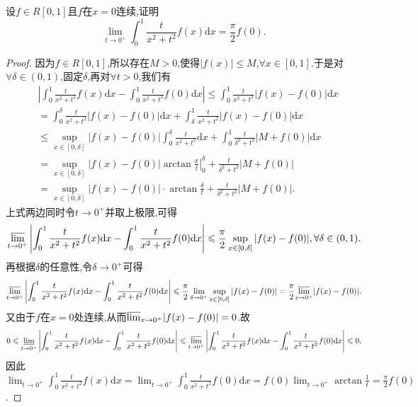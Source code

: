 \documentclass[../../main.tex]{subfiles}
\begin{document}
\begin{example}[$\,\,$Possion核]\label{example:Possion核}
设\(f\in R[0,1]\)且\(f\)在\(x = 0\)连续,证明
\[
\lim_{t\rightarrow 0^+} \int_0^1{\frac{t}{x^2+t^2}f(x)\mathrm{d}x}=\frac{\pi}{2}f(0).
\]
\end{example}
\begin{proof}
因为\(f\in R[0,1]\),所以存在\(M > 0\),使得\(\vert f(x)\vert\leqslant M\),\(\forall x\in [0,1]\).于是对\(\forall\delta\in(0,1)\),固定\(\delta\),再对\(\forall t > 0\),我们有
\begin{align*}
&\left|\int_0^1\frac{t}{x^2 + t^2}f(x)\mathrm{d}x - \int_0^1\frac{t}{x^2 + t^2}f(0)\mathrm{d}x\right| \leqslant \int_0^1\frac{t}{x^2 + t^2}\vert f(x) - f(0)\vert \mathrm{d}x\\
&= \int_0^{\delta}\frac{t}{x^2 + t^2}\vert f(x) - f(0)\vert \mathrm{d}x + \int_{\delta}^1\frac{t}{x^2 + t^2}\vert f(x) - f(0)\vert \mathrm{d}x\\
&\leqslant \sup_{x\in[0,\delta]}\vert f(x) - f(0)\vert\int_0^{\delta}\frac{t}{x^2 + t^2}\mathrm{d}x + \int_0^1\frac{t}{\delta^2 + t^2}\vert M + f(0)\vert \mathrm{d}x\\
&= \sup_{x\in[0,\delta]}\vert f(x) - f(0)\vert\left.\arctan\frac{x}{t}\right|_{0}^{\delta} + \frac{t}{\delta^2 + t^2}\vert M + f(0)\vert\\
&= \sup_{x\in[0,\delta]}\vert f(x) - f(0)\vert\cdot\arctan\frac{\delta}{t} + \frac{t}{\delta^2 + t^2}\vert M + f(0)\vert.
\end{align*}
上式两边同时令\(t\rightarrow 0^+\)并取上极限,可得
\[
{\varlimsup_{t\rightarrow 0^+}}\left|\int_0^1\frac{t}{x^2 + t^2}f(x)\mathrm{d}x - \int_0^1\frac{t}{x^2 + t^2}f(0)\mathrm{d}x\right| \leqslant \frac{\pi}{2}\sup_{x\in[0,\delta]}\vert f(x) - f(0)\vert, \forall\delta\in(0,1).
\]
再根据\(\delta\)的任意性,令\(\delta\rightarrow 0^+\)可得
\[
{\varlimsup_{t\rightarrow 0^+}}\left|\int_0^1\frac{t}{x^2 + t^2}f(x)\mathrm{d}x - \int_0^1\frac{t}{x^2 + t^2}f(0)\mathrm{d}x\right| \leqslant \frac{\pi}{2}\lim_{\delta\rightarrow 0^+}\sup_{x\in[0,\delta]}\vert f(x) - f(0)\vert = \frac{\pi}{2}{\varlimsup_{x\rightarrow 0^+}}\vert f(x) - f(0)\vert.
\]
又由于\(f\)在\(x = 0\)处连续,从而\({\varlimsup_{x\rightarrow 0^+}}\vert f(x) - f(0)\vert = 0\).故
\[
0\leqslant \underset{t\rightarrow 0^+}{{\varliminf }}\left| \int_0^1{\frac{t}{x^2+t^2}f(x)\mathrm{d}x}-\int_0^1{\frac{t}{x^2+t^2}f(0)\mathrm{d}x} \right|\leqslant {\varlimsup_{t\rightarrow 0^+} }\left| \int_0^1{\frac{t}{x^2+t^2}f(x)\mathrm{d}x}-\int_0^1{\frac{t}{x^2+t^2}f(0)\mathrm{d}x} \right|\leqslant 0.
\]
因此\(\lim_{t\rightarrow 0^+}\int_0^1\frac{t}{x^2 + t^2}f(x)\mathrm{d}x = \lim_{t\rightarrow 0^+}\int_0^1\frac{t}{x^2 + t^2}f(0)\mathrm{d}x = f(0)\lim_{t\rightarrow 0^+}\arctan\frac{1}{t} = \frac{\pi}{2}f(0)\).
\end{proof}
\end{document}

